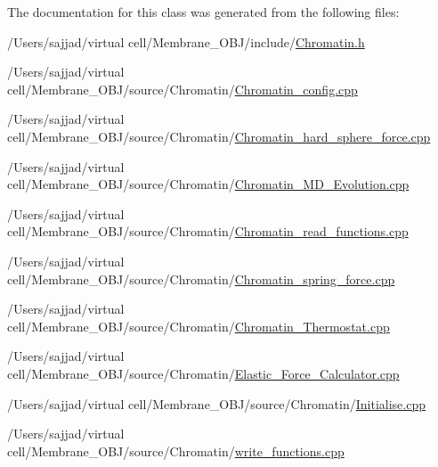 The documentation for this class was generated from the following files\+:\begin{DoxyCompactItemize}
\item 
/\+Users/sajjad/virtual cell/\+Membrane\+\_\+\+O\+B\+J/include/\mbox{\hyperlink{Chromatin_8h}{Chromatin.\+h}}\item 
/\+Users/sajjad/virtual cell/\+Membrane\+\_\+\+O\+B\+J/source/\+Chromatin/\mbox{\hyperlink{Chromatin__config_8cpp}{Chromatin\+\_\+config.\+cpp}}\item 
/\+Users/sajjad/virtual cell/\+Membrane\+\_\+\+O\+B\+J/source/\+Chromatin/\mbox{\hyperlink{Chromatin__hard__sphere__force_8cpp}{Chromatin\+\_\+hard\+\_\+sphere\+\_\+force.\+cpp}}\item 
/\+Users/sajjad/virtual cell/\+Membrane\+\_\+\+O\+B\+J/source/\+Chromatin/\mbox{\hyperlink{Chromatin__MD__Evolution_8cpp}{Chromatin\+\_\+\+M\+D\+\_\+\+Evolution.\+cpp}}\item 
/\+Users/sajjad/virtual cell/\+Membrane\+\_\+\+O\+B\+J/source/\+Chromatin/\mbox{\hyperlink{Chromatin__read__functions_8cpp}{Chromatin\+\_\+read\+\_\+functions.\+cpp}}\item 
/\+Users/sajjad/virtual cell/\+Membrane\+\_\+\+O\+B\+J/source/\+Chromatin/\mbox{\hyperlink{Chromatin__spring__force_8cpp}{Chromatin\+\_\+spring\+\_\+force.\+cpp}}\item 
/\+Users/sajjad/virtual cell/\+Membrane\+\_\+\+O\+B\+J/source/\+Chromatin/\mbox{\hyperlink{Chromatin__Thermostat_8cpp}{Chromatin\+\_\+\+Thermostat.\+cpp}}\item 
/\+Users/sajjad/virtual cell/\+Membrane\+\_\+\+O\+B\+J/source/\+Chromatin/\mbox{\hyperlink{Chromatin_2Elastic__Force__Calculator_8cpp}{Elastic\+\_\+\+Force\+\_\+\+Calculator.\+cpp}}\item 
/\+Users/sajjad/virtual cell/\+Membrane\+\_\+\+O\+B\+J/source/\+Chromatin/\mbox{\hyperlink{Chromatin_2Initialise_8cpp}{Initialise.\+cpp}}\item 
/\+Users/sajjad/virtual cell/\+Membrane\+\_\+\+O\+B\+J/source/\+Chromatin/\mbox{\hyperlink{Chromatin_2write__functions_8cpp}{write\+\_\+functions.\+cpp}}\end{DoxyCompactItemize}
